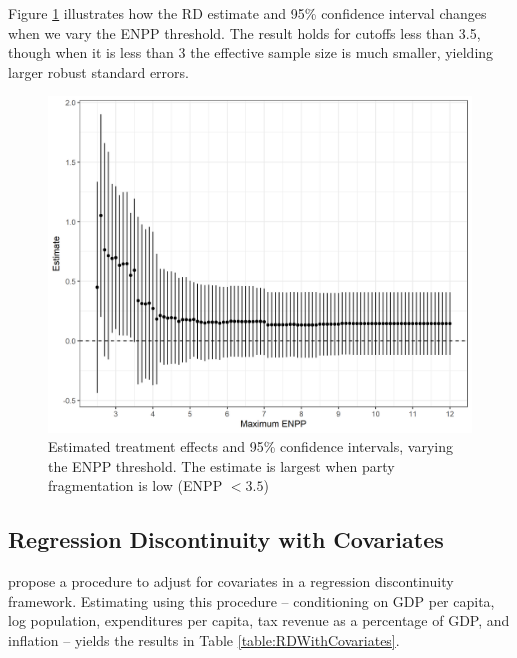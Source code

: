 \documentclass[12pt]{article}
\begin{document}
\begin{appendices}
	Figure \ref{fig:rdEstimateVaryingENPP} illustrates how the RD estimate and 95\% confidence interval changes when we vary the ENPP threshold. The result holds for cutoffs less than 3.5, though when it is less than 3 the effective sample size is much smaller, yielding larger robust standard errors. 
	
	\begin{figure}[h]
		\centering
		\includegraphics[width=\linewidth]{figures/Figure8.png}
		\caption{Estimated treatment effects and 95\% confidence intervals, varying the ENPP threshold. The estimate is largest when party fragmentation is low (ENPP $< 3.5$)}
		\label{fig:rdEstimateVaryingENPP}
	\end{figure}

	\subsection{Regression Discontinuity with Covariates}
	
	\citet{Calonico2018} propose a procedure to adjust for covariates in a regression discontinuity framework. Estimating using this procedure -- conditioning on GDP per capita, log population, expenditures per capita, tax revenue as a percentage of GDP, and inflation -- yields the results in Table \ref{table:RDWithCovariates}. 
	

\end{appendices}
\end{document}
